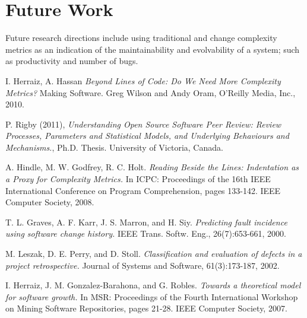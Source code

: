 \documentclass[9pt,twocolumn,a4paper]{article}
\begin{document}
\section{Future Work}
Future research directions include using traditional and change complexity metrics as an indication of the maintainability and evolvability of a system; such as productivity and number of bugs.

\begin{thebibliography}{9}

I. Herraiz, A. Hassan  {\em Beyond Lines of Code: Do We Need More Complexity Metrics?} Making Software. Greg Wilson and Andy Oram,
  O'Reilly Media, Inc., 
  2010.
  
P. Rigby (2011), {\em Understanding Open Source Software Peer Review:
Review Processes, Parameters and Statistical Models, and
Underlying Behaviours and Mechanisms.},  
Ph.D. Thesis. University of Victoria, Canada.

A. Hindle, M. W. Godfrey, R. C. Holt. {\em Reading Beside the Lines: Indentation as a Proxy for Complexity Metrics.} In ICPC: Proceedings of the 16th IEEE International
Conference on Program Comprehension, pages 133-142. IEEE Computer Society,
2008.


T. L. Graves, A. F. Karr, J. S. Marron, and H. Siy. {\em Predicting fault incidence using
software change history.} IEEE Trans. Softw. Eng., 26(7):653-661, 2000.

M. Leszak, D. E. Perry, and D. Stoll. { \em Classification and evaluation of defects in a
project retrospective.} Journal of Systems and Software, 61(3):173-187, 2002.

I. Herraiz, J. M. Gonzalez-Barahona, and G. Robles. { \em Towards a theoretical model
for software growth.} In MSR: Proceedings of the Fourth International Workshop on
Mining Software Repositories, pages 21-28. IEEE Computer Society, 2007.




\end{thebibliography}
\end{document}
